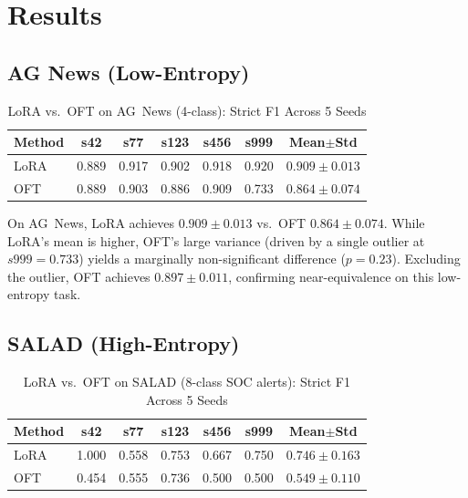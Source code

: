 \documentclass[review,3p]{elsarticle}
\begin{document}
\section{Results}

\subsection{AG News (Low-Entropy)}

\begin{table}[!ht]
\centering\caption{LoRA vs.\ OFT on AG~News (4-class): Strict F1 Across 5 Seeds}
\label{tab:results_ag}
\begin{tabular}{lcccccc}
\toprule \textbf{Method} & \textbf{s42} & \textbf{s77} & \textbf{s123} & \textbf{s456} & \textbf{s999} & \textbf{Mean$\pm$Std} \\
\midrule
LoRA & 0.889 & 0.917 & 0.902 & 0.918 & 0.920 & $\mathbf{0.909 \pm 0.013}$ \\
OFT  & 0.889 & 0.903 & 0.886 & 0.909 & 0.733 & $0.864 \pm 0.074$ \\
\bottomrule
\end{tabular}
\end{table}

On AG~News, LoRA achieves $0.909 \pm 0.013$ vs.\ OFT $0.864 \pm 0.074$. While LoRA's mean is higher, OFT's large variance (driven by a single outlier at $s999 = 0.733$) yields a marginally non-significant difference ($p = 0.23$). Excluding the outlier, OFT achieves $0.897 \pm 0.011$, confirming near-equivalence on this low-entropy task.

\subsection{SALAD (High-Entropy)}

\begin{table}[!ht]
\centering\caption{LoRA vs.\ OFT on SALAD (8-class SOC alerts): Strict F1 Across 5 Seeds}
\label{tab:results_salad}
\begin{tabular}{lcccccc}
\toprule \textbf{Method} & \textbf{s42} & \textbf{s77} & \textbf{s123} & \textbf{s456} & \textbf{s999} & \textbf{Mean$\pm$Std} \\
\midrule
LoRA & 1.000 & 0.558 & 0.753 & 0.667 & 0.750 & $\mathbf{0.746 \pm 0.163}$ \\
OFT  & 0.454 & 0.555 & 0.736 & 0.500 & 0.500 & $0.549 \pm 0.110$ \\
\bottomrule
\end{tabular}
\end{table}
\end{document}
